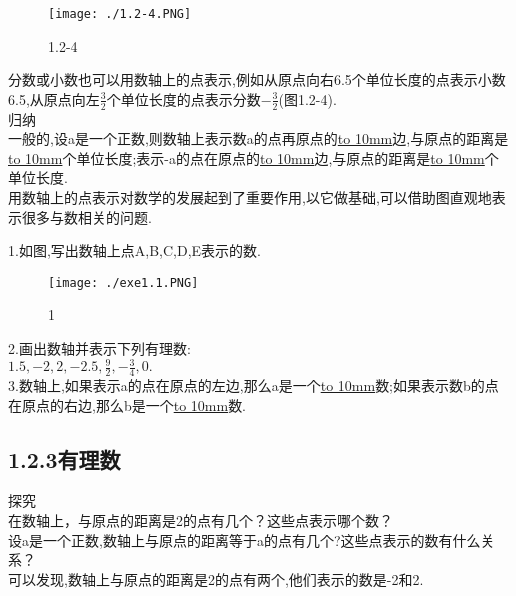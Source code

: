 \documentclass{article}
\begin{document}
	\begin{figure}[ht!]
		\centering
		\texttt{[image: ./1.2-4.PNG]}
		\caption{1.2-4}
	\end{figure}
	\indent 分数或小数也可以用数轴上的点表示,例如从原点向右6.5个单位长度的点表示小数6.5,从原点向左$\frac{3}{2}$个单位长度的点表示分数$-\frac{3}{2}$(图1.2-4).\\
	
	归纳\\
	\indent 一般的,设a是一个正数,则数轴上表示数a的点再原点的\underline{\hbox to 10mm{}}边,与原点的距离是\underline{\hbox to 10mm{}}个单位长度;表示-a的点在原点的\underline{\hbox to 10mm{}}边,与原点的距离是\underline{\hbox to 10mm{}}个单位长度.\\
	\indent 用数轴上的点表示对数学的发展起到了重要作用,以它做基础,可以借助图直观地表示很多与数相关的问题.\\
	
	\begin{exercise}
		1.如图,写出数轴上点A,B,C,D,E表示的数.\\
		\begin{figure}[ht!]
			\centering
			\texttt{[image: ./exe1.1.PNG]}
			\caption{1}
		\end{figure}
		2.画出数轴并表示下列有理数:\\
		\indent $1.5,-2,2,-2.5,\frac{9}{2},-\frac{3}{4},0.$\\
		3.数轴上,如果表示a的点在原点的左边,那么a是一个\underline{\hbox to 10mm{}}数;如果表示数b的点在原点的右边,那么b是一个\underline{\hbox to 10mm{}}数.\\
	\end{exercise}

	\subsection*{1.2.3有理数}
	探究\\
	\indent 在数轴上，与原点的距离是2的点有几个？这些点表示哪个数？\\
	设a是一个正数,数轴上与原点的距离等于a的点有几个?这些点表示的数有什么关系？\\
	\indent 可以发现,数轴上与原点的距离是2的点有两个,他们表示的数是-2和2.\\
	
\end{document}
